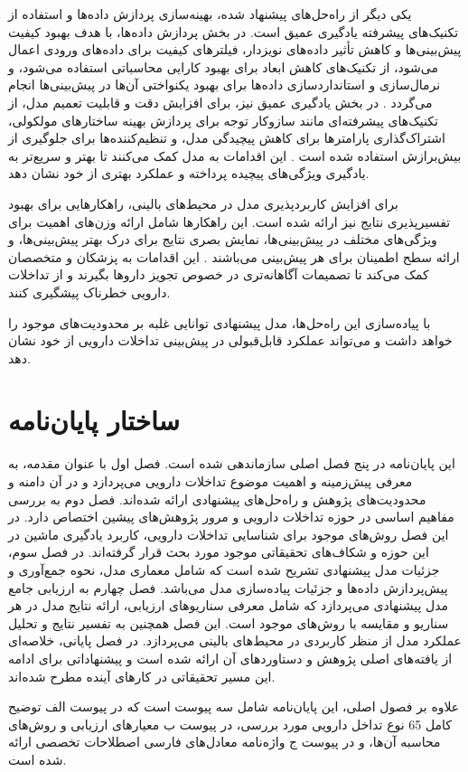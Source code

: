 یکی دیگر از راه‌حل‌های پیشنهاد شده، بهینه‌سازی پردازش داده‌ها و استفاده از تکنیک‌های پیشرفته یادگیری عمیق است. در بخش پردازش داده‌ها، با هدف بهبود کیفیت پیش‌بینی‌ها و کاهش تأثیر داده‌های نویزدار، فیلترهای کیفیت برای داده‌های ورودی اعمال می‌شود، از تکنیک‌های کاهش ابعاد برای بهبود کارایی محاسباتی استفاده می‌شود، و نرمال‌سازی و استانداردسازی داده‌ها برای بهبود یکنواختی آن‌ها در پیش‌بینی‌ها انجام می‌گردد \cite{ref_he2023}. در بخش یادگیری عمیق نیز، برای افزایش دقت و قابلیت تعمیم مدل، از تکنیک‌های پیشرفته‌ای مانند سازوکار توجه برای پردازش بهینه ساختارهای مولکولی، اشتراک‌گذاری پارامترها برای کاهش پیچیدگی مدل، و تنظیم‌کننده‌ها برای جلوگیری از بیش‌برازش استفاده شده است \cite{ref_li2023}. این اقدامات به مدل کمک می‌کنند تا بهتر و سریع‌تر به یادگیری ویژگی‌های پیچیده پرداخته و عملکرد بهتری از خود نشان دهد.

برای افزایش کاربردپذیری مدل در محیط‌های بالینی، راهکارهایی برای بهبود تفسیرپذیری نتایج نیز ارائه شده است. این راهکارها شامل ارائه وزن‌های اهمیت برای ویژگی‌های مختلف در پیش‌بینی‌ها، نمایش بصری نتایج برای درک بهتر پیش‌بینی‌ها، و ارائه سطح اطمینان برای هر پیش‌بینی می‌باشند \cite{ref_shi2024}. این اقدامات به پزشکان و متخصصان کمک می‌کند تا تصمیمات آگاهانه‌تری در خصوص تجویز داروها بگیرند و از تداخلات دارویی خطرناک پیشگیری کنند.

با پیاده‌سازی این راه‌حل‌ها، مدل پیشنهادی توانایی غلبه بر محدودیت‌های موجود را خواهد داشت و می‌تواند عملکرد قابل‌قبولی در پیش‌بینی تداخلات دارویی از خود نشان دهد.

\section{ساختار پایان‌نامه}

این پایان‌نامه در پنج فصل اصلی سازماندهی شده است. فصل اول با عنوان مقدمه، به معرفی پیش‌زمینه و اهمیت موضوع تداخلات دارویی می‌پردازد و در آن دامنه و محدودیت‌های پژوهش و راه‌حل‌های پیشنهادی ارائه شده‌اند. فصل دوم به بررسی مفاهیم اساسی در حوزه تداخلات دارویی و مرور پژوهش‌های پیشین اختصاص دارد. در این فصل روش‌های موجود برای شناسایی تداخلات دارویی، کاربرد یادگیری ماشین در این حوزه و شکاف‌های تحقیقاتی موجود مورد بحث قرار گرفته‌اند. در فصل سوم، جزئیات مدل پیشنهادی تشریح شده است که شامل معماری مدل، نحوه جمع‌آوری و پیش‌پردازش داده‌ها و جزئیات پیاده‌سازی مدل می‌باشد. فصل چهارم به ارزیابی جامع مدل پیشنهادی می‌پردازد که شامل معرفی سناریوهای ارزیابی، ارائه نتایج مدل در هر سناریو و مقایسه با روش‌های موجود است. این فصل همچنین به تفسیر نتایج و تحلیل عملکرد مدل از منظر کاربردی در محیط‌های بالینی می‌پردازد. در فصل پایانی، خلاصه‌ای از یافته‌های اصلی پژوهش و دستاوردهای آن ارائه شده است و پیشنهاداتی برای ادامه این مسیر تحقیقاتی در کارهای آینده مطرح شده‌اند.

علاوه بر فصول اصلی، این پایان‌نامه شامل سه پیوست است که در پیوست الف توضیح کامل 65 نوع تداخل دارویی مورد بررسی، در پیوست ب معیارهای ارزیابی و روش‌های محاسبه آن‌ها، و در پیوست ج واژه‌نامه معادل‌های فارسی اصطلاحات تخصصی ارائه شده است.
